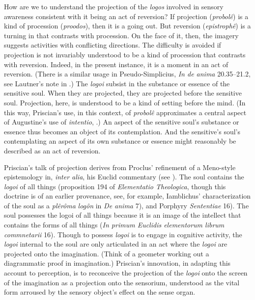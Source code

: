 \documentclass[12pt]{article}
\begin{document}
How are we to understand the projection of the \emph{logos} involved in sensory awareness consistent with it being an act of reversion? If projection (\emph{probolê}) is a kind of procession (\emph{proodos}), then it is a going out. But reversion (\emph{epistrophê}) is a turning in that contrasts with procession. On the face of it, then, the imagery suggests activities with conflicting directions. The difficulty is avoided if projection is not invariably understood to be a kind of procession that contrasts with reversion. Indeed, in the present instance, it is a moment in an act of reversion. (There is a similar usage in Pseudo-Simplicius, \emph{In de anima} 20.35--21.2, see Lautner's note in \citealt[164--165 n.94]{Urmson:2013vf}.) The \emph{logoi} subsist in the substance or essence of the sensitive soul. When they are projected, they are projected before the sensitive soul. Projection, here, is understood to be a kind of setting before the mind. (In this way, Priscian's use, in this context, of \emph{probolê} approximates a central aspect of Augustine's use of \emph{intentio}, \citealt[84--87]{ODaly:1987fq}.) An aspect of the sensitive soul's substance or essence thus becomes an object of its contemplation. And the sensitive's soul's contemplating an aspect of its own substance or essence might reasonably be described as an act of reversion.

Priscian's talk of projection derives from Proclus' refinement of a Meno-style epistemology in, \emph{inter alia}, his Euclid commentary (see \citealt[][for discussion]{Steel:1997ec}). The soul contains the \emph{logoi} of all things (proposition 194 of \emph{Elementatio Theologica}, though this doctrine is of an earlier provenance, see, for example,  Iamblichus' characterization of the soul as a \emph{plêrôma} \emph{logôn} in \emph{De anima} 7), and Porphyry \emph{Sententiae} 16). The soul possesses the logoi of all things because it is an image of the intellect that contains the forms of all things (\emph{In primum Euclidis elementorum librum commnetarii} 16). Though to possess \emph{logoi} is to engage in cognitive activity, the \emph{logoi} internal to the soul are only articulated in an act where the \emph{logoi} are projected onto the imagination. (Think of a geometer working out a diagrammatic proof in imagination.) Priscian's innovation, in adapting this account to perception, is to reconceive the projection of the \emph{logoi} onto the screen of the imagination as a projection onto the sensorium, understood as the vital form arroused by the sensory object's effect on the sense organ.
\end{document}
